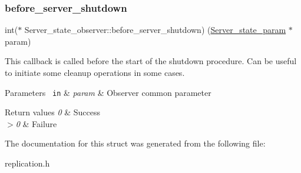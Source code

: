 \subsubsection{\texorpdfstring{before\+\_\+server\+\_\+shutdown}{before\_server\_shutdown}}
{\footnotesize\ttfamily int($\ast$ Server\+\_\+state\+\_\+observer\+::before\+\_\+server\+\_\+shutdown) (\mbox{\hyperlink{structServer__state__param}{Server\+\_\+state\+\_\+param}} $\ast$param)}

This callback is called before the start of the shutdown procedure. Can be useful to initiate some cleanup operations in some cases.


\begin{DoxyParams}[1]{Parameters}
\mbox{\texttt{ in}}  & {\em param} & Observer common parameter\\
\hline
\end{DoxyParams}

\begin{DoxyRetVals}{Return values}
{\em 0} & Success \\
\hline
{\em $>$0} & Failure \\
\hline
\end{DoxyRetVals}


The documentation for this struct was generated from the following file\+:\begin{DoxyCompactItemize}
\item 
replication.\+h\end{DoxyCompactItemize}
